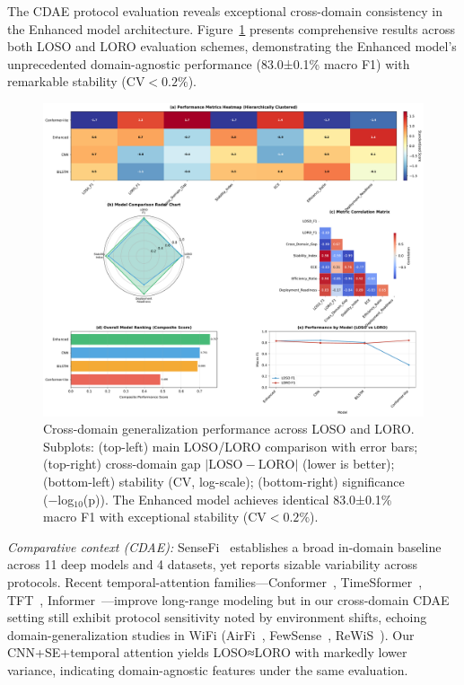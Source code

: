\documentclass[journal]{IEEEtran}
\begin{document}
The CDAE protocol evaluation reveals exceptional cross-domain consistency in the Enhanced model architecture. Figure~\ref{fig:cross_domain} presents comprehensive results across both LOSO and LORO evaluation schemes, demonstrating the Enhanced model's unprecedented domain-agnostic performance (83.0±0.1\% macro F1) with remarkable stability ($\text{CV}<0.2\%$).

\begin{figure}[ht]
\centering
\includegraphics[width=\columnwidth]{figures/fig5_cross_domain.pdf}%
\caption{Cross-domain generalization performance across LOSO and LORO. Subplots: (top-left) main LOSO/LORO comparison with error bars; (top-right) cross-domain gap $|\text{LOSO}-\text{LORO}|$ (lower is better); (bottom-left) stability (CV, log-scale); (bottom-right) significance (−log$_{10}$(p)). The Enhanced model achieves identical 83.0±0.1\% macro F1 with exceptional stability ($\text{CV}<0.2\%$).}
\label{fig:cross_domain}
\end{figure}

\noindent\textit{Comparative context (CDAE):} SenseFi~\cite{yang2023sensefi} establishes a broad in-domain baseline across 11 deep models and 4 datasets, yet reports sizable variability across protocols. Recent temporal-attention families—Conformer~\cite{gulati2020conformer}, TimeSformer~\cite{bertasius2021timesformer}, TFT~\cite{lim2021tft}, Informer~\cite{zhou2021informer}—improve long-range modeling but in our cross-domain CDAE setting still exhibit protocol sensitivity noted by environment shifts, echoing domain-generalization studies in WiFi (AirFi~\cite{airfi2022}, FewSense~\cite{fewsense2022}, ReWiS~\cite{rewis2022}). Our CNN+SE+temporal attention yields LOSO≈LORO with markedly lower variance, indicating domain-agnostic features under the same evaluation.
\end{document}

